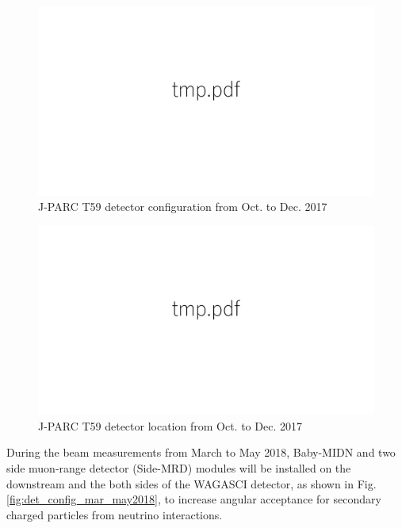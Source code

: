  \begin{figure}[tbh]
\begin{center}
\includegraphics[width=0.8\linewidth]{fig/tmp.pdf}
\end{center}
\caption{
J-PARC T59 detector configuration from Oct. to Dec. 2017
}
\label{fig:det_confg_oct_dec2017}
\end{figure}


\begin{figure}[tbh]
\begin{center}
\includegraphics[width=0.8\linewidth]{fig/tmp.pdf}
\end{center}
\caption{
J-PARC T59 detector location from Oct. to Dec. 2017
}
\label{fig:det_loc_oct_dec2017}
\end{figure}


During the beam measurements from March to May 2018, Baby-MIDN and two side muon-range detector (Side-MRD) modules will be installed on the downstream and the both sides of the WAGASCI detector, as shown in Fig. \ref{fig:det_config_mar_may2018}, to increase angular acceptance for secondary charged particles from neutrino interactions.
 
